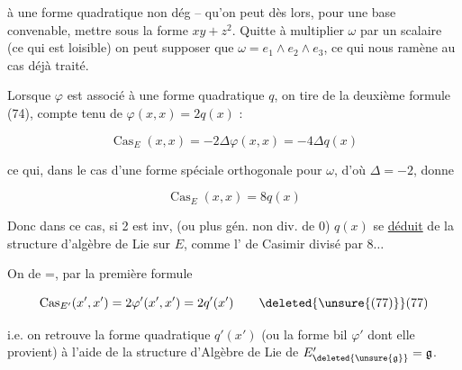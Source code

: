à une forme quadratique non dég -- qu'on peut dès lors, pour une base convenable, mettre sous la forme $xy+z^2$. Quitte à multiplier $\omega$ par un scalaire (ce qui est loisible) on peut supposer que $\omega=e_1\wedge e_2\wedge e_3$, ce qui nous ramène au cas déjà traité.

Lorsque $\varphi$ est associé à une forme quadratique $q$, on tire de la deuxième formule (74), compte tenu de $\varphi(x,x)=2q(x)$ :

\[
\operatorname{Cas}_E(x,x)=-2\Delta\varphi(x,x)=-4\Delta q(x) \tag*{(75)}
\]

ce qui, dans le cas d'une forme  spéciale orthogonale pour $\omega$, d'où $\Delta=-2$, donne

\[
\operatorname{Cas}_E(x,x)=8q(x) \tag*{(76)}
\]

Donc dans ce cas,  si 2 est inv, (ou plus gén. non div. de 0) $q(x)$ se \uline{déduit} de la structure d'algèbre de Lie sur $E$, comme l' de Casimir divisé par $8\ldots$

On  de =, par la première formule

\[
\operatorname{Cas}_{E'}(x',x')=2\varphi'(x',x')=2q'(x') \tag*{\deleted{\unsure{(77)}}(77)}
\]

i.e. on retrouve la forme quadratique $q'(x')$ (ou la forme bil $\varphi'$ dont elle provient) à l'aide de la structure d'Algèbre de Lie de $E'_{\deleted{\unsure{\mathfrak g}}}=\mathfrak g$.

